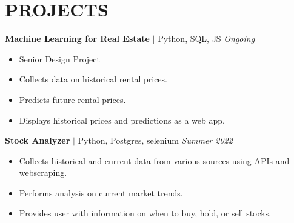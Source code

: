 \documentclass[11pt, a4paper, roman]{moderncv}
\newcommand{\project}[5]{
	\textbf{#1}
	$|$ #3 
	\hfill\textit{#4}
	#5
	\vspace{2mm}
}
\begin{document}
\vspace*{-2mm}
\section{PROJECTS}

{\project{Machine Learning for Real Estate}{}{Python, SQL, JS}{Ongoing}
	{\begin{itemize}
		\item Senior Design Project
		\item Collects data on historical rental prices.
		\item Predicts future rental prices.
		\item Displays historical prices and predictions as a web app.
	\end{itemize}}
}

{\project{Stock Analyzer}{}{Python, Postgres, selenium}{Summer 2022}
	{\begin{itemize}
		\item Collects historical and current data from various sources using APIs and webscraping.
		\item Performs analysis on current market trends.
		\item Provides user with information on when to buy, hold, or sell stocks.
	\end{itemize}}
}
\end{document}
